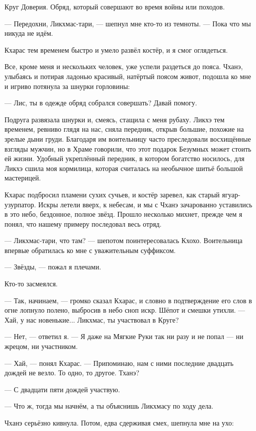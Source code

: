 Круг Доверия.
Обряд, который совершают во время войны или походов.

--- Передохни, Ликхмас-тари, --- шепнул мне кто-то из темноты.
--- Пока что мы никуда не идём.

Кхарас тем временем быстро и умело развёл костёр, и я смог оглядеться.

Все, кроме меня и нескольких человек, уже успели раздеться до пояса.
Чханэ, улыбаясь и потирая ладонью красивый, натёртый поясом живот, подошла ко мне и игриво потянула за шнурки горловины:

--- Лис, ты в одежде обряд собрался совершать?
Давай помогу.

Подруга развязала шнурки и, смеясь, стащила с меня рубаху.
Ликхэ тем временем, ревниво глядя на нас, сняла передник, открыв большие, похожие на зрелые дыни груди.
Благодаря им воительницу часто преследовали восхищённые взгляды мужчин, но в Храме говорили, что этот подарок Безумных может стоить ей жизни.
Удобный укреплённый передник, в котором богатство носилось, для Ликхэ сшила моя кормилица, которая считалась на необычное шитьё большой мастерицей.

Кхарас подбросил пламени сухих сучьев, и костёр заревел, как старый ягуар-узурпатор.
Искры летели вверх, к небесам, и мы с Чханэ зачарованно уставились в это небо, бездонное, полное звёзд.
Прошло несколько михнет, прежде чем я понял, что нашему примеру последовал весь отряд.

--- Ликхмас-тари, что там? --- шепотом поинтересовалась Кхохо.
Воительница впервые обратилась ко мне с уважительным суффиксом.

--- Звёзды, --- пожал я плечами.

Кто-то засмеялся.

--- Так, начинаем, --- громко сказал Кхарас, и словно в подтверждение его слов в огне лопнуло полено, выбросив в небо сноп искр.
Шёпот и смешки утихли.
--- Хай, у нас новенькие...
Ликхмас, ты участвовал в Круге?

--- Нет, --- ответил я.
--- Я даже на Мягкие Руки так ни разу и не попал --- ни жрецом, ни участником.

--- Хай, --- понял Кхарас.
--- Припоминаю, нам с ними последние двадцать дождей не везло.
То одно, то другое.
Тханэ?

--- С двадцати пяти дождей участвую.

--- Что ж, тогда мы начнём, а ты объяснишь Ликхмасу по ходу дела.

Чханэ серьёзно кивнула.
Потом, едва сдерживая смех, шепнула мне на ухо:

